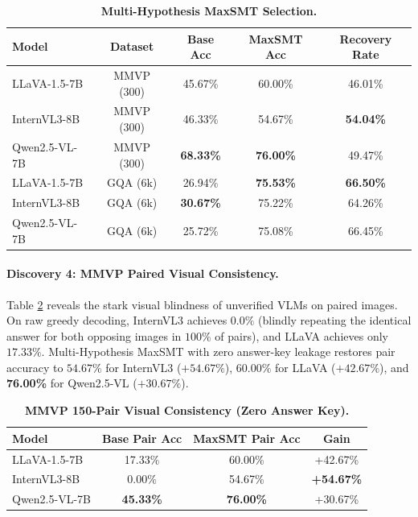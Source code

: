 \documentclass[10pt,twocolumn,letterpaper]{article}
\begin{document}
\begin{table}[h]
\centering
\small
\caption{\textbf{Multi-Hypothesis MaxSMT Selection.}}
\label{tab:multi_hypothesis}
\begin{tabular}{lcccc}
\toprule
\textbf{Model} & \textbf{Dataset} & \textbf{Base Acc} & \textbf{MaxSMT Acc} & \textbf{Recovery Rate} \\
\midrule
LLaVA-1.5-7B & MMVP (300) & 45.67\% & 60.00\% & 46.01\% \\
InternVL3-8B & MMVP (300) & 46.33\% & 54.67\% & \textbf{54.04\%} \\
Qwen2.5-VL-7B & MMVP (300) & \textbf{68.33\%} & \textbf{76.00\%} & 49.47\% \\
\midrule
LLaVA-1.5-7B & GQA (6k) & 26.94\% & \textbf{75.53\%} & \textbf{66.50\%} \\
InternVL3-8B & GQA (6k) & \textbf{30.67\%} & 75.22\% & 64.26\% \\
Qwen2.5-VL-7B & GQA (6k) & 25.72\% & 75.08\% & 66.45\% \\
\bottomrule
\end{tabular}
\end{table}

\paragraph{Discovery 4: MMVP Paired Visual Consistency.}
Table \ref{tab:mmvp_paired} reveals the stark visual blindness of unverified VLMs on paired images. On raw greedy decoding, InternVL3 achieves $0.0\%$ (blindly repeating the identical answer for both opposing images in $100\%$ of pairs), and LLaVA achieves only $17.33\%$. Multi-Hypothesis MaxSMT with zero answer-key leakage restores pair accuracy to $54.67\%$ for InternVL3 ($+54.67\%$), $60.00\%$ for LLaVA ($+42.67\%$), and \textbf{76.00\%} for Qwen2.5-VL ($+30.67\%$).

\begin{table}[h]
\centering
\small
\caption{\textbf{MMVP 150-Pair Visual Consistency (Zero Answer Key).}}
\label{tab:mmvp_paired}
\begin{tabular}{lccc}
\toprule
\textbf{Model} & \textbf{Base Pair Acc} & \textbf{MaxSMT Pair Acc} & \textbf{Gain} \\
\midrule
LLaVA-1.5-7B & 17.33\% & 60.00\% & +42.67\% \\
InternVL3-8B & 0.00\% & 54.67\% & \textbf{+54.67\%} \\
Qwen2.5-VL-7B & \textbf{45.33\%} & \textbf{76.00\%} & +30.67\% \\
\bottomrule
\end{tabular}
\end{table}
\end{document}
